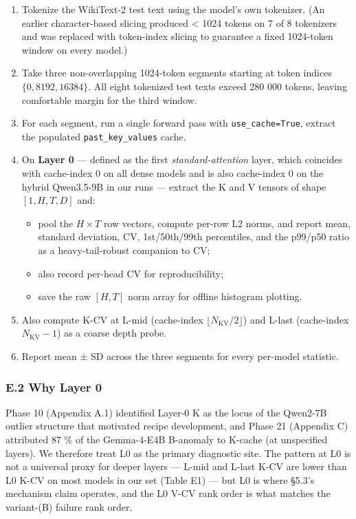 \documentclass[
]{article}
\providecommand{\tightlist}{%
  \setlength{\itemsep}{0pt}\setlength{\parskip}{0pt}}
\begin{document}
\begin{enumerate}
\def\labelenumi{\arabic{enumi}.}
\tightlist
\item
  Tokenize the WikiText-2 test text using the model's own tokenizer. (An
  earlier character-based slicing produced \textless{} 1024 tokens on 7
  of 8 tokenizers and was replaced with token-index slicing to guarantee
  a fixed 1024-token window on every model.)
\item
  Take three non-overlapping 1024-token segments starting at token
  indices \(\{0, 8192, 16384\}\). All eight tokenized test texts exceed
  280 000 tokens, leaving comfortable margin for the third window.
\item
  For each segment, run a single forward pass with
  \texttt{use\_cache=True}, extract the populated
  \texttt{past\_key\_values} cache.
\item
  On \textbf{Layer 0} --- defined as the first \emph{standard-attention}
  layer, which coincides with cache-index 0 on all dense models and is
  also cache-index 0 on the hybrid Qwen3.5-9B in our runs --- extract
  the K and V tensors of shape \([1, H, T, D]\) and:

  \begin{itemize}
  \tightlist
  \item
    pool the \(H \times T\) row vectors, compute per-row L2 norms, and
    report mean, standard deviation, CV, 1st/50th/99th percentiles, and
    the p99/p50 ratio as a heavy-tail-robust companion to CV;
  \item
    also record per-head CV for reproducibility;
  \item
    save the raw \([H, T]\) norm array for offline histogram plotting.
  \end{itemize}
\item
  Also compute K-CV at L-mid (cache-index
  \(\lfloor N_{\mathrm{KV}} / 2 \rfloor\)) and L-last (cache-index
  \(N_{\mathrm{KV}} - 1\)) as a coarse depth probe.
\item
  Report mean ± SD across the three segments for every per-model
  statistic.
\end{enumerate}

\subsubsection{E.2 Why Layer 0}\label{e.2-why-layer-0}

Phase 10 (Appendix A.1) identified Layer-0 K as the locus of the
Qwen2-7B outlier structure that motivated recipe development, and Phase
21 (Appendix C) attributed 87 \% of the Gemma-4-E4B B-anomaly to K-cache
(at unspecified layers). We therefore treat L0 as the primary diagnostic
site. The pattern at L0 is not a universal proxy for deeper layers ---
L-mid and L-last K-CV are lower than L0 K-CV on most models in our set
(Table E1) --- but L0 is where §5.3's mechanism claim operates, and the
L0 V-CV rank order is what matches the variant-(B) failure rank order.
\end{document}
